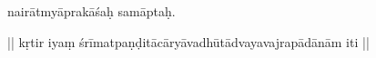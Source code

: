 \documentclass[naipra.tex]{subfiles}
\begin{document}
\begin{sanskrit}



\medskip\pstart
nairātmyāprakāśaḥ samāptaḥ. 
\pend

\bigskip\pstart
\begin{center}
|| kṛtir iyaṃ śrīmatpaṇḍitācāryāvadhūtādvayavajrapādānām iti ||
\end{center}
\pend



\end{sanskrit}
\endnumbering
\end{document}
